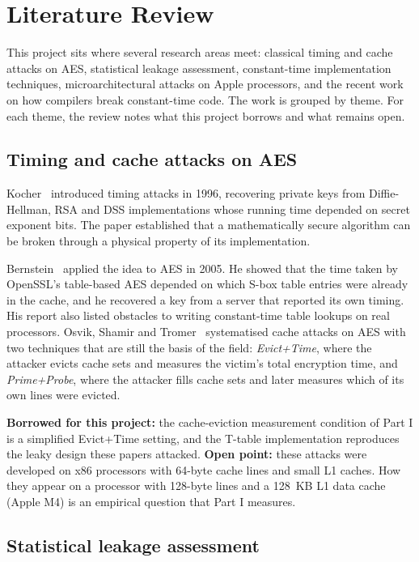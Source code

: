 \chapter{Literature Review}
\label{ch:lit}

This project sits where several research areas meet: classical timing and cache attacks on AES, statistical leakage assessment, constant-time implementation techniques, microarchitectural attacks on Apple processors, and the recent work on how compilers break constant-time code. The work is grouped by theme. For each theme, the review notes what this project borrows and what remains open.

\section{Timing and cache attacks on AES}
\label{sec:lit_attacks}

Kocher~\cite{kocher96} introduced timing attacks in 1996, recovering private keys from Diffie-Hellman, RSA and DSS implementations whose running time depended on secret exponent bits. The paper established that a mathematically secure algorithm can be broken through a physical property of its implementation.

Bernstein~\cite{bernstein05} applied the idea to AES in 2005. He showed that the time taken by OpenSSL's table-based AES depended on which S-box table entries were already in the cache, and he recovered a key from a server that reported its own timing. His report also listed obstacles to writing constant-time table lookups on real processors. Osvik, Shamir and Tromer~\cite{osvik06} systematised cache attacks on AES with two techniques that are still the basis of the field: \emph{Evict+Time}, where the attacker evicts cache sets and measures the victim's total encryption time, and \emph{Prime+Probe}, where the attacker fills cache sets and later measures which of its own lines were evicted.

\textbf{Borrowed for this project:} the cache-eviction measurement condition of Part I is a simplified Evict+Time setting, and the T-table implementation reproduces the leaky design these papers attacked. \textbf{Open point:} these attacks were developed on x86 processors with 64-byte cache lines and small L1 caches. How they appear on a processor with 128-byte lines and a 128~KB L1 data cache (Apple M4) is an empirical question that Part I measures.

\section{Statistical leakage assessment}
\label{sec:lit_tvla}

